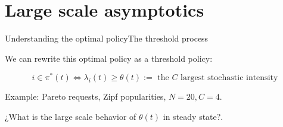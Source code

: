 \documentclass[aspectratio=169]{beamer}
\begin{document}
\section{Large scale asymptotics}

\begin{frame}{Understanding the optimal policy}{The threshold process}
	
	We can rewrite this optimal policy as a \alert{threshold} policy:

	\begin{equation*}
		i\in\pi^*(t) \Leftrightarrow \lambda_i(t) \geqslant \theta(t) := \text{ the $C$ largest stochastic intensity}
	\end{equation*}

	\vfill
	\alert{Example:} Pareto requests, Zipf popularities, $N=20, C=4$.
	\begin{center}
		
	\end{center}

	\vfill

	¿What is the large scale behavior of $\theta(t)$ in steady state?.
\end{frame}

	
\end{document}
